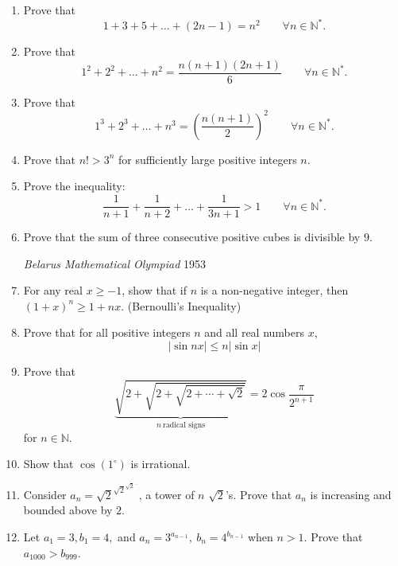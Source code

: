 \documentclass[12pt,a4paper,twoside]{article}
\theoremstyle{remark}
\begin{document}
\begin{enumerate}


\item Prove that $$1+3+5+\ldots+(2n-1)=n^2 \qquad \forall n \in \mathbb{N}^*.$$

\item Prove that $$1^2+2^2+\ldots+n^2=\dfrac{n(n+1)(2n+1)}{6} \qquad \forall n \in \mathbb{N}^*.$$

\item Prove that $$1^3+2^3+\ldots+n^3=\left(\dfrac{n(n+1)}{2}\right)^2 \qquad \forall n \in \mathbb{N}^*.$$

\item Prove that $n!>3^n$ for sufficiently large positive integers $n$.

\item Prove the inequality:
$$\dfrac{1}{n + 1} + \dfrac{1}{n + 2} + \ldots + \dfrac{1}{3n + 1} > 1 \qquad \forall n \in \mathbb{N}^*.$$

\item Prove that the sum of three consecutive positive cubes is divisible by $9$.
\begin{flushright}
\emph{Belarus Mathematical Olympiad} 1953
\end{flushright}

\item For any real $x\ge-1$, show that if $n$ is a non-negative integer, then $(1+x)^n\ge 1+nx$. (Bernoulli's Inequality)

\item Prove that for all positive integers $n$ and all real numbers $x$,
\begin{equation}
|\sin n x| \leq n |\sin x|
\end{equation}

\item Prove that
$$\underbrace{\sqrt{2 + \sqrt{2 + \sqrt{2 + \cdots + \sqrt{2}}}}}_{n \ \textrm{radical signs}} = 2\cos \frac{\pi}{2^{n + 1}}$$for $n \in \mathbb{N}$.

\item Show that $\cos(1^\circ)$ is irrational.

\item Consider $a_n=\sqrt 2^{\sqrt2^{\sqrt2^{\ldots}}}$, a tower of $n$ $\sqrt2$'s. Prove that $a_n$ is increasing and bounded above by $2$.

\item Let $a_1 = 3, b_1 = 4,$ and $a_n = 3^{a_{n-1}}, \ b_n = 4^{b_{n-1}}$ when $n > 1$. Prove that $a_{1000} > b_{999}$.


\end{enumerate}
\end{document}
